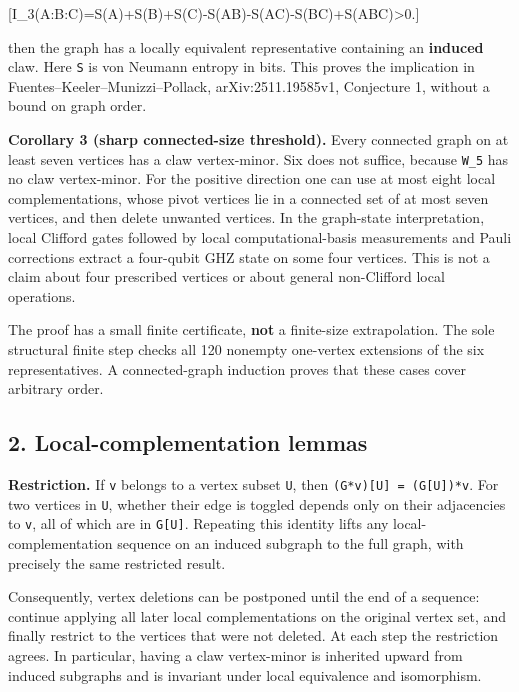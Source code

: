 \documentclass[
  11pt,
]{article}
\begin{document}
{[}I\_3(A:B:C)=S(A)+S(B)+S(C)-S(AB)-S(AC)-S(BC)+S(ABC)\textgreater0.{]}

then the graph has a locally equivalent representative containing an
\textbf{induced} claw. Here \texttt{S} is von Neumann entropy in bits.
This proves the implication in Fuentes--Keeler--Munizzi--Pollack,
arXiv:2511.19585v1, Conjecture 1, without a bound on graph order.

\textbf{Corollary 3 (sharp connected-size threshold).} Every connected
graph on at least seven vertices has a claw vertex-minor. Six does not
suffice, because \texttt{W\_5} has no claw vertex-minor. For the
positive direction one can use at most eight local complementations,
whose pivot vertices lie in a connected set of at most seven vertices,
and then delete unwanted vertices. In the graph-state interpretation,
local Clifford gates followed by local computational-basis measurements
and Pauli corrections extract a four-qubit GHZ state on some four
vertices. This is not a claim about four prescribed vertices or about
general non-Clifford local operations.

The proof has a small finite certificate, \textbf{not} a finite-size
extrapolation. The sole structural finite step checks all 120 nonempty
one-vertex extensions of the six representatives. A connected-graph
induction proves that these cases cover arbitrary order.

\subsection{2. Local-complementation
lemmas}\label{local-complementation-lemmas}

\textbf{Restriction.} If \texttt{v} belongs to a vertex subset
\texttt{U}, then \texttt{(G*v){[}U{]}\ =\ (G{[}U{]})*v}. For two
vertices in \texttt{U}, whether their edge is toggled depends only on
their adjacencies to \texttt{v}, all of which are in \texttt{G{[}U{]}}.
Repeating this identity lifts any local-complementation sequence on an
induced subgraph to the full graph, with precisely the same restricted
result.

Consequently, vertex deletions can be postponed until the end of a
sequence: continue applying all later local complementations on the
original vertex set, and finally restrict to the vertices that were not
deleted. At each step the restriction agrees. In particular, having a
claw vertex-minor is inherited upward from induced subgraphs and is
invariant under local equivalence and isomorphism.
\end{document}

